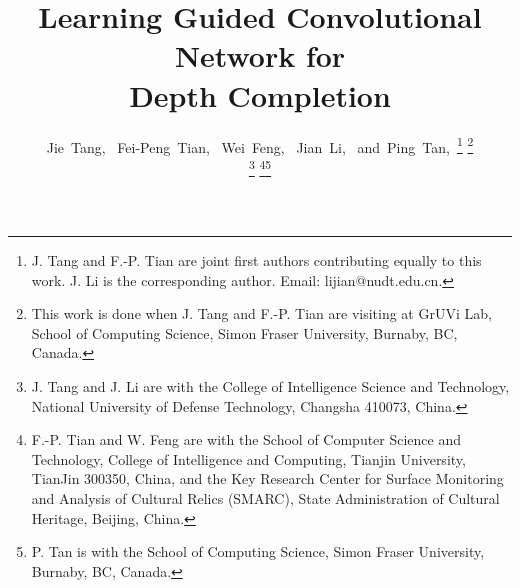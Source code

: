 \documentclass[journal]{IEEEtran}
\begin{document}
\title{Learning Guided Convolutional Network for \\ Depth Completion}


\author{Jie~Tang,~
        Fei-Peng~Tian,~
        Wei~Feng,~
        Jian~Li,~
        and~Ping~Tan,~\thanks{J. Tang and F.-P. Tian are joint first authors contributing equally to this work. 
J. Li is the corresponding author. Email: lijian@nudt.edu.cn.}
\thanks{This work is done when J. Tang and F.-P. Tian are visiting at GrUVi Lab, School of Computing Science, Simon Fraser University, Burnaby, BC, Canada.}

\thanks{J. Tang and J. Li are with the College of Intelligence Science and Technology,
National University of Defense
Technology, Changsha 410073, China.}
\thanks{F.-P. Tian and W. Feng are with the School of Computer
Science and Technology, College of Intelligence and Computing, Tianjin University, TianJin 300350, China, and the Key Research Center for Surface Monitoring and Analysis of Cultural Relics (SMARC), State Administration of Cultural Heritage, Beijing, China.}\thanks{P. Tan is with the School of Computing Science, Simon Fraser University, Burnaby, BC, Canada.}
}




















\maketitle
\end{document}

